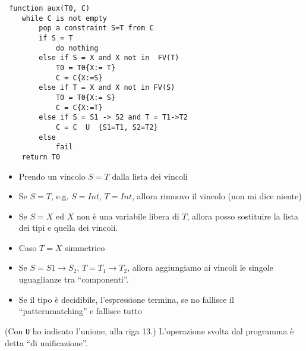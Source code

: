 \documentclass[a4paper,10pt]{article}
\begin{document}
\begin{multicols}{2}
 
\begin{lstlisting}
 function aux(T0, C)
    while C is not empty
        pop a constraint S=T from C
        if S = T
            do nothing
        else if S = X and X not in  FV(T)
            T0 = T0{X:= T}
            C = C{X:=S}
        else if T = X and X not in FV(S)
            T0 = T0{X:= S}
            C = C{X:=T}
        else if S = S1 -> S2 and T = T1->T2
            C = C  U  {S1=T1, S2=T2}
        else
            fail
    return T0
\end{lstlisting}
\begin{itemize}
 \item Prendo un vincolo $S = T$ dalla lista dei vincoli
 \item Se $S = T$, e.g. $S = Int$, $T = Int$, allora rimuovo il vincolo (non mi dice niente)
 \item Se $S = X$ ed $X$ non è una variabile libera di $T$, allora posso sostituire la lista dei tipi e quella dei vincoli.
 \item Caso $T = X$ simmetrico
 \item Se $S = S1 \to S_2$, $T = T_1 \to T_2$, allora aggiungiamo ai vincoli le singole uguaglianze tra ``componenti''.
 \item Se il tipo è decidibile, l'espressione termina, se no fallisce il ``patternmatching'' e fallisce tutto
\end{itemize}

\end{multicols}

(Con \texttt{U} ho indicato l'unione, alla riga 13.) L'operazione svolta dal programma è detta ``di unificazione''.
\end{document}
